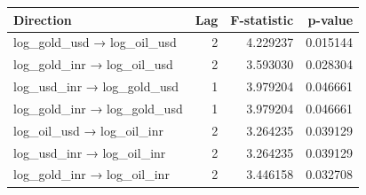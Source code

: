 \begin{tabular}{lrrr}
\toprule
Direction & Lag & F-statistic & p-value \\
\midrule
log_gold_usd → log_oil_usd & 2 & 4.229237 & 0.015144 \\
log_gold_inr → log_oil_usd & 2 & 3.593030 & 0.028304 \\
log_usd_inr → log_gold_usd & 1 & 3.979204 & 0.046661 \\
log_gold_inr → log_gold_usd & 1 & 3.979204 & 0.046661 \\
log_oil_usd → log_oil_inr & 2 & 3.264235 & 0.039129 \\
log_usd_inr → log_oil_inr & 2 & 3.264235 & 0.039129 \\
log_gold_inr → log_oil_inr & 2 & 3.446158 & 0.032708 \\
\bottomrule
\end{tabular}
